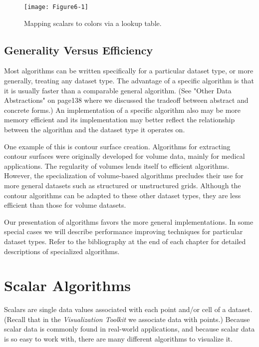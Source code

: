 \begin{figure}[!htb]
	\centering
	\texttt{[image: Figure6-1]}\\
	\caption{Mapping scalars to colors via a lookup table.}\label{fig:Figure6-1}
\end{figure}

\subsection{Generality Versus Efficiency}
\label{subsec:benerality_vs_efficiency}

Most algorithms can be written specifically for a particular dataset type, or more generally, treating any dataset type. The advantage of a specific algorithm is that it is usually faster than a comparable general algorithm. (See "Other Data Abstractions" on page138 where we discussed the tradeoff between abstract and concrete forms.) An implementation of a specific algorithm also may be more memory efficient and its implementation may better reflect the relationship between the algorithm and the dataset type it operates on.

One example of this is contour surface creation. Algorithms for extracting contour surfaces were originally developed for volume data, mainly for medical applications. The regularity of volumes lends itself to efficient algorithms. However, the specialization of volume-based algorithms precludes their use for more general datasets such as structured or unstructured grids. Although the contour algorithms can be adapted to these other dataset types, they are less efficient than those for volume datasets.

Our presentation of algorithms favors the more general implementations. In some special cases we will describe performance improving techniques for particular dataset types. Refer to the bibliography at the end of each chapter for detailed descriptions of specialized algorithms.

\section{Scalar Algorithms}

Scalars are single data values associated with each point and/or cell of a dataset. (Recall that in the \emph{Visualization Toolkit} we associate data with points.) Because scalar data is commonly found in real-world applications, and because scalar data is so easy to work with, there are many different algorithms to visualize it.

